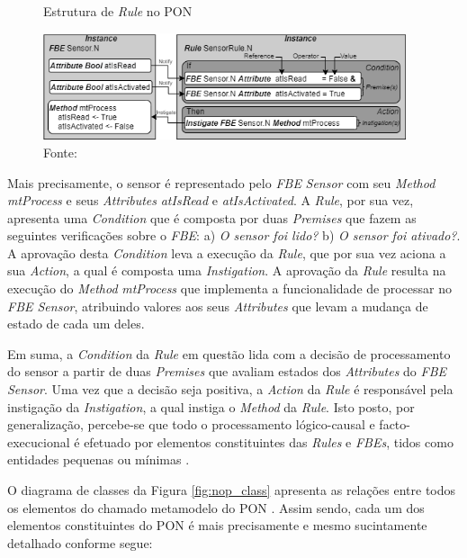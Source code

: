 \begin{figure}[!htb]
  \centering
  \caption{Estrutura de \textit{Rule} no PON}
  \includegraphics[width=0.95\textwidth]{../figures/rule_sensor_icist.png}
  \smallskip\smallskip\smallskip \caption*{Fonte: }
  \label{fig:nop_rule}
\end{figure}

Mais precisamente, o sensor é representado pelo \textit{FBE} \textit{Sensor} com
seu \textit{Method} \textit{mtProcess} e seus \textit{Attributes}
\textit{atIsRead} e \textit{atIsActivated}. A \textit{Rule}, por sua vez,
apresenta uma \textit{Condition} que é composta por duas \textit{Premises} que
fazem as seguintes verificações sobre o \textit{FBE}: a) \textit{O sensor foi
  lido?} b) \textit{O sensor foi ativado?}. A aprovação desta \textit{Condition}
leva a execução da \textit{Rule}, que por sua vez aciona a sua \textit{Action},
a qual é composta uma \textit{Instigation}. A aprovação da \textit{Rule} resulta
na execução do \textit{Method} \textit{mtProcess} que implementa a
funcionalidade de processar no \textit{FBE Sensor}, atribuindo valores aos seus
\textit{Attributes} que levam a mudança de estado de cada um deles.

Em suma, a \textit{Condition} da \textit{Rule} em questão lida com a decisão de
processamento do sensor a partir de duas \textit{Premises} que avaliam estados
dos \textit{Attributes} do \textit{FBE Sensor}. Uma vez que a decisão seja
positiva, a \textit{Action} da \textit{Rule} é responsável pela instigação da
\textit{Instigation}, a qual instiga o \textit{Method} da \textit{Rule}. Isto
posto, por generalização, percebe-se que todo o processamento lógico-causal e
facto-execucional é efetuado por elementos constituintes das \textit{Rules} e
\textit{FBEs}, tidos como entidades pequenas ou mínimas
\cite{pat_simao_2008,simao_2009,doc_Kerschbaumer_2018}.

O diagrama de classes da Figura \ref{fig:nop_class} apresenta as relações entre
todos os elementos do chamado metamodelo do PON
\cite{simao_2009,msc_Ronszcka_2012,simao_2012a}. Assim sendo, cada um dos
elementos constituintes do PON é mais precisamente e mesmo sucintamente
detalhado conforme segue:

